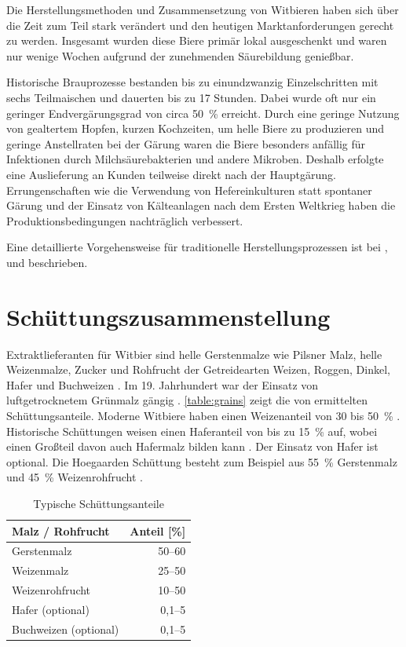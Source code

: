 \documentclass[a4paper,parskip=half]{scrartcl}
\begin{document}
Die Herstellungsmethoden und Zusammensetzung von Witbieren haben
sich über die Zeit zum Teil stark verändert und den heutigen
Marktanforderungen gerecht zu werden. Insgesamt wurden diese
Biere primär lokal ausgeschenkt und waren nur wenige
Wochen aufgrund der zunehmenden Säurebildung genießbar.
\parencite[118]{Strottner1999}

Historische Brauprozesse bestanden bis zu einundzwanzig
Einzelschritten mit sechs Teilmaischen und dauerten bis zu
17 Stunden. Dabei wurde oft nur ein geringer Endvergärungsgrad
von circa 50~\% erreicht. Durch eine geringe Nutzung von gealtertem
Hopfen, kurzen Kochzeiten, um helle Biere zu produzieren 
und geringe Anstellraten bei der Gärung waren die Biere besonders
anfällig für Infektionen durch Milchsäurebakterien und andere Mikroben.
Deshalb erfolgte eine Auslieferung an Kunden teilweise direkt nach
der Hauptgärung. Errungenschaften wie die Verwendung von
Hefereinkulturen statt spontaner Gärung und der Einsatz von
Kälteanlagen nach dem Ersten Weltkrieg haben die Produktionsbedingungen
nachträglich verbessert. \parencite[38-41]{Hieronymus2010}

Eine detaillierte Vorgehensweise für traditionelle Herstellungsprozessen
ist bei \citeauthor{Hieronymus2010}, \citeauthor{Mulder2020} und
\citeauthor{Strottner1999} beschrieben.

\section*{Schüttungszusammenstellung}

Extraktlieferanten für Witbier sind helle Gerstenmalze wie Pilsner Malz,
helle Weizenmalze, Zucker und Rohfrucht der Getreidearten Weizen, Roggen,
Dinkel, Hafer und Buchweizen \parencite[14]{Strottner1999}. Im 19.
Jahrhundert war der Einsatz von luftgetrocknetem Grünmalz gängig
\parencite[38]{Hieronymus2010}. \autoref{table:grains} zeigt die von \citeauthor{Strottner1999}
ermittelten Schüttungsanteile. Moderne Witbiere haben einen Weizenanteil
von 30 bis 50~\% \parencite[45]{Mulder2020}. Historische
Schüttungen weisen einen Haferanteil von bis zu 15~\% auf, wobei
einen Großteil davon auch Hafermalz bilden kann \parencite[45]{Hieronymus2010}.
Der Einsatz von Hafer ist optional. Die Hoegaarden Schüttung
besteht zum Beispiel aus 55~\% Gerstenmalz und 45~\% Weizenrohfrucht \parencite[43]{Strottner1999}.

\begin{table}[H]
\centering
\begin{tabular}{lr}
\toprule
Malz / Rohfrucht      & Anteil [\%] \\
\midrule
Gerstenmalz           & 50–60 \\
Weizenmalz            & 25–50 \\
Weizenrohfrucht       & 10–50 \\
Hafer (optional)      & 0,1–5 \\
Buchweizen (optional) & 0,1–5 \\
\bottomrule
\end{tabular}
\caption{Typische Schüttungsanteile \parencite[13]{Strottner1999}}
\label{table:grains}
\end{table}
\end{document}
